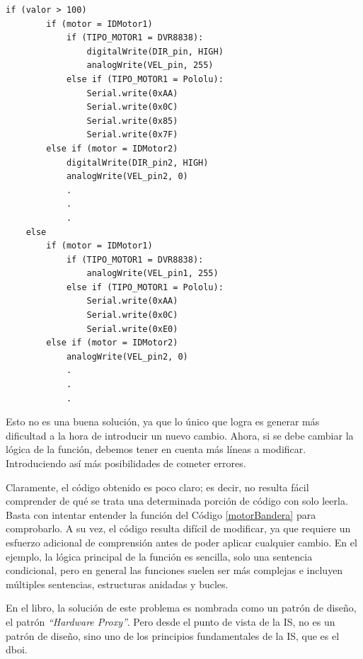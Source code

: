 \begin{enumerate}
\begin{lstlisting}[caption=Modificación de la función controlar\_motor para utilizar bandera indicadora de tipo de placa controladora.,label={motorBandera}]
    if (valor > 100)
        if (motor = IDMotor1)
            if (TIPO_MOTOR1 = DVR8838):
                digitalWrite(DIR_pin, HIGH)
                analogWrite(VEL_pin, 255)
            else if (TIPO_MOTOR1 = Pololu):
                Serial.write(0xAA)
                Serial.write(0x0C)
                Serial.write(0x85)
                Serial.write(0x7F)
        else if (motor = IDMotor2)
            digitalWrite(DIR_pin2, HIGH)
            analogWrite(VEL_pin2, 0)
            .
            .
            .
    else
        if (motor = IDMotor1)
            if (TIPO_MOTOR1 = DVR8838):
                analogWrite(VEL_pin1, 255)
            else if (TIPO_MOTOR1 = Pololu):
                Serial.write(0xAA)
                Serial.write(0x0C)
                Serial.write(0xE0)
        else if (motor = IDMotor2)
            analogWrite(VEL_pin2, 0)
            .
            .
            .

\end{lstlisting}

Esto no es una buena solución, ya que lo único que logra es generar más dificultad a la hora de introducir un nuevo cambio. Ahora, si se debe cambiar la lógica de la función, debemos tener en cuenta más líneas a modificar. Introduciendo así más posibilidades de cometer errores.

Claramente, el código obtenido es poco claro; es decir, no resulta fácil comprender de qué se trata una determinada porción de código con solo leerla. Basta con intentar entender la función del Código \ref{motorBandera} para comprobarlo. A su vez, el código resulta difícil de modificar, ya que requiere un esfuerzo adicional de comprensión antes de poder aplicar cualquier cambio. En el ejemplo, la lógica principal de la función es sencilla, solo una sentencia condicional, pero en general las funciones suelen ser más complejas e incluyen múltiples sentencias, estructuras anidadas y bucles.


\end{enumerate}

En el libro, la solución de este problema es nombrada como un patrón de diseño, el patrón \textit{``Hardware Proxy''}. Pero desde el punto de vista de la IS, no es un patrón de diseño, sino uno de los principios fundamentales de la  IS, que es el \gls{dboi}.


